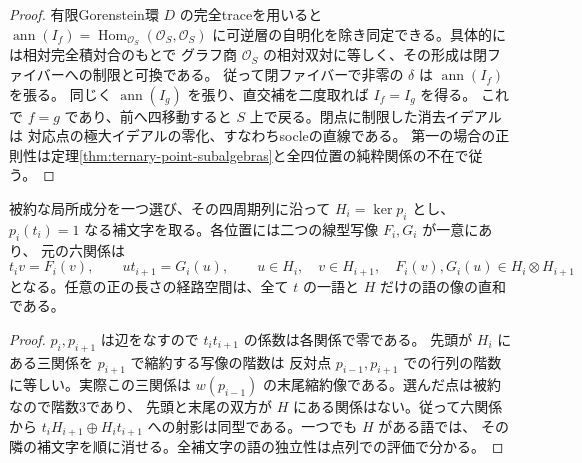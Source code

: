\begin{proof}
有限Gorenstein環 $D$ の完全traceを用いると
$\operatorname{ann}(I_f)=\operatorname{Hom}_{\mathcal O_S}(\mathcal O_S,\mathcal O_S)$
に可逆層の自明化を除き同定できる。具体的には相対完全積対合のもとで
グラフ商 $\mathcal O_S$ の相対双対に等しく、その形成は閉ファイバーへの制限と可換である。
従って閉ファイバーで非零の $\delta$ は $\operatorname{ann}(I_f)$ を張る。
同じく $\operatorname{ann}(I_g)$ を張り、直交補を二度取れば $I_f=I_g$ を得る。
これで $f=g$ であり、前へ四移動すると $S$ 上で戻る。閉点に制限した消去イデアルは
対応点の極大イデアルの零化、すなわちsocleの直線である。
第一の場合の正則性は定理\ref{thm:ternary-point-subalgebras}と全四位置の純粋関係の不在で従う。
\end{proof}

\begin{corollary}\label{cor:reduced-point-six-mixed-relations}
被約な局所成分を一つ選び、その四周期列に沿って $H_i=\ker p_i$ とし、
$p_i(t_i)=1$ なる補文字を取る。各位置には二つの線型写像 $F_i,G_i$ が一意にあり、
元の六関係は
\[
 t_i v=F_i(v),\qquad u t_{i+1}=G_i(u),\qquad
 u\in H_i,\quad v\in H_{i+1},\quad F_i(v),G_i(u)\in H_i\otimes H_{i+1}
\]
となる。任意の正の長さの経路空間は、全て $t$ の一語と $H$ だけの語の像の直和である。
\end{corollary}
\begin{proof}
$p_i,p_{i+1}$ は辺をなすので $t_i t_{i+1}$ の係数は各関係で零である。
先頭が $H_i$ にある三関係を $p_{i+1}$ で縮約する写像の階数は
反対点 $p_{i-1},p_{i+1}$ での行列の階数に等しい。実際この三関係は
$w(p_{i-1})$ の末尾縮約像である。選んだ点は被約なので階数3であり、
先頭と末尾の双方が $H$ にある関係はない。従って六関係から
$t_i H_{i+1}\oplus H_i t_{i+1}$ への射影は同型である。一つでも $H$ がある語では、
その隣の補文字を順に消せる。全補文字の語の独立性は点列での評価で分かる。
\end{proof}

